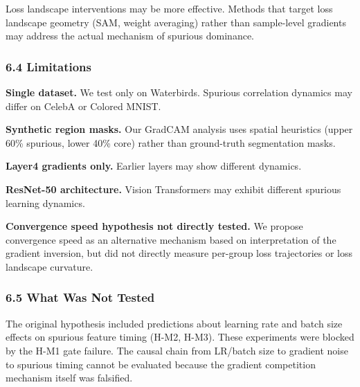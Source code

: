 Loss landscape interventions may be more effective. Methods that target loss landscape geometry (SAM, weight averaging) rather than sample-level gradients may address the actual mechanism of spurious dominance.

\subsubsection{6.4 Limitations}

\textbf{Single dataset.} We test only on Waterbirds. Spurious correlation dynamics may differ on CelebA or Colored MNIST.

\textbf{Synthetic region masks.} Our GradCAM analysis uses spatial heuristics (upper 60\% spurious, lower 40\% core) rather than ground-truth segmentation masks.

\textbf{Layer4 gradients only.} Earlier layers may show different dynamics.

\textbf{ResNet-50 architecture.} Vision Transformers may exhibit different spurious learning dynamics.

\textbf{Convergence speed hypothesis not directly tested.} We propose convergence speed as an alternative mechanism based on interpretation of the gradient inversion, but did not directly measure per-group loss trajectories or loss landscape curvature.

\subsubsection{6.5 What Was Not Tested}

The original hypothesis included predictions about learning rate and batch size effects on spurious feature timing (H-M2, H-M3). These experiments were blocked by the H-M1 gate failure. The causal chain from LR/batch size to gradient noise to spurious timing cannot be evaluated because the gradient competition mechanism itself was falsified.
